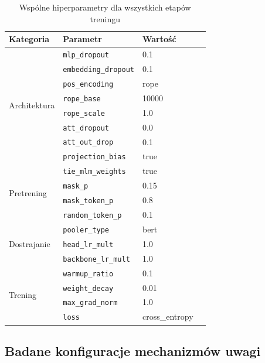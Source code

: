 \documentclass[a4paper,11pt,twoside]{report}
\theoremstyle{definition}
\begin{document}
\begin{table}[t!]
\centering
\caption{Wspólne hiperparametry dla wszystkich etapów treningu}
\label{tab:common-training-params}
\smallskip
\small
\begin{tabular}{@{}llll@{}}
\toprule
\textbf{Kategoria} & \textbf{Parametr} & \textbf{Wartość} & \\
\midrule
\multirow{8}{*}{Architektura} 
    & \texttt{mlp\_dropout}          & 0.1 & \\
    & \texttt{embedding\_dropout}    & 0.1 & \\
    & \texttt{pos\_encoding}         & rope & \\
    & \texttt{rope\_base} & 10000 & \\
    & \texttt{rope\_scale} & 1.0 & \\
    & \texttt{att\_dropout}    & 0.0 & \\
    & \texttt{att\_out\_drop} & 0.1 & \\
    & \texttt{projection\_bias}      & true & \\
\midrule
\multirow{4}{*}{Pretrening} 
    & \texttt{tie\_mlm\_weights}    & true & \\
    & \texttt{mask\_p}              & 0.15 & \\
    & \texttt{mask\_token\_p}       & 0.8 & \\
    & \texttt{random\_token\_p}     & 0.1 & \\
\midrule
\multirow{3}{*}{Dostrajanie} 
    & \texttt{pooler\_type}         & bert & \\
    & \texttt{head\_lr\_mult}   & 1.0 & \\
    & \texttt{backbone\_lr\_mult}   & 1.0 & \\
\midrule
\multirow{4}{*}{Trening} 
    & \texttt{warmup\_ratio}        & 0.1 & \\
    & \texttt{weight\_decay}        & 0.01 & \\
    & \texttt{max\_grad\_norm}      & 1.0 & \\
    & \texttt{loss}                 & cross\_entropy & \\
\bottomrule
\end{tabular}
\end{table}




\subsection{Badane konfiguracje mechanizmów uwagi}\label{sec:attention-configs}
\end{document}
